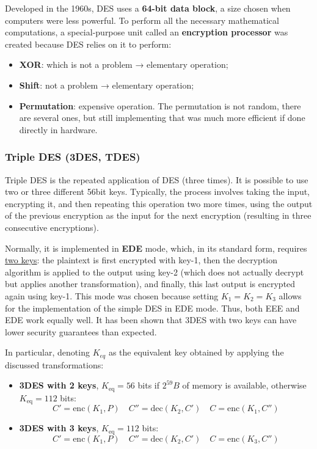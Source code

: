Developed in the 1960s, DES uses a \textbf{64-bit data block}, a size chosen when computers were less powerful. To perform all the necessary mathematical computations, a special-purpose unit called an \textbf{encryption processor} was created because DES relies on it to perform:

\begin{itemize}
    \item \textbf{XOR}: which is not a problem → elementary operation;
    \item \textbf{Shift}: not a problem → elementary operation;
    \item \textbf{Permutation}: expensive operation. The permutation is not random, there are several ones, but still implementing that was much more efficient if done directly in hardware.
\end{itemize}

\subsubsection{Triple DES (3DES, TDES)}
Triple DES is the repeated application of DES (three times). It is possible to use two or three different 56bit keys.
Typically, the process involves taking the input, encrypting it, and then repeating this operation two more times, using the output of the previous encryption as the input for the next encryption (resulting in three consecutive encryptions).

Normally, it is implemented in \textbf{EDE} mode, which, in its standard form, requires \ul{two keys}: the plaintext is first encrypted with key-1, then the decryption algorithm is applied to the output using key-2 (which does not actually decrypt but applies another transformation), and finally, this last output is encrypted again using key-1.
This mode was chosen because setting $K_1 = K_2 = K_3$ allows for the implementation of the simple DES in EDE mode.
Thus, both EEE and EDE work equally well. It has been shown that 3DES with two keys can have lower security guarantees than expected.

In particular, denoting $K_{eq}$ as the equivalent key obtained by applying the discussed transformations:
\begin{itemize}
    \item \textbf{3DES with 2 keys},
          \(K_{\text{eq}} = 56\) bits if $2^{59}B$ of memory is available, otherwise \(K_{\text{eq}} = 112\) bits:
          \[C' = \text{enc}(K_1, P) \quad C'' = \text{dec}(K_2, C') \quad C = \text{enc}(K_1, C'')\]
    \item \textbf{3DES with 3 keys}, \(K_{\text{eq}} = 112\) bits:
          \[C' = \text{enc}(K_1, P) \quad C'' = \text{dec}(K_2, C') \quad C = \text{enc}(K_3, C'')\]
\end{itemize}

